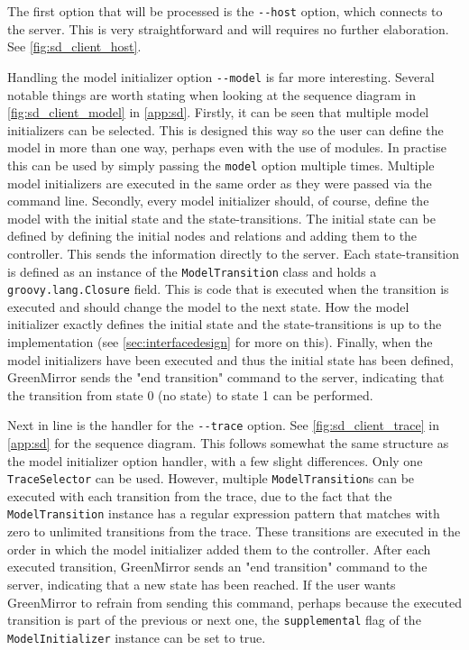\documentclass[a4paper]{article}
\begin{document}
	The first option that will be processed is the \lstinline{--host} option, which connects to the server. This is very straightforward and will requires no further elaboration. See \cref{fig:sd_client_host}.
	
	Handling the model initializer option \lstinline{--model} is far more interesting. Several notable things are worth stating when looking at the sequence diagram in \cref{fig:sd_client_model} in \cref{app:sd}. Firstly, it can be seen that multiple model initializers can be selected. This is designed this way so the user can define the model in more than one way, perhaps even with the use of modules. In practise this can be used by simply passing the \lstinline{model} option multiple times. Multiple model initializers are executed in the same order as they were passed via the command line. Secondly, every model initializer should, of course, define the model with the initial state and the state-transitions. The initial state can be defined by defining the initial nodes and relations and adding them to the controller. This sends the information directly to the server. Each state-transition is defined as an instance of the \lstinline{ModelTransition} class and holds a \lstinline{groovy.lang.Closure} field. This is code that is executed when the transition is executed and should change the model to the next state. How the model initializer exactly defines the initial state and the state-transitions is up to the implementation (see \cref{sec:interfacedesign} for more on this). Finally, when the model initializers have been executed and thus the initial state has been defined, GreenMirror sends the "end transition" command to the server, indicating that the transition from state 0 (no state) to state 1 can be performed. 
	
	Next in line is the handler for the \lstinline{--trace} option. See \cref{fig:sd_client_trace} in \cref{app:sd} for the sequence diagram. This follows somewhat the same structure as the model initializer option handler, with a few slight differences. Only one \lstinline{TraceSelector} can be used. However, multiple \lstinline{ModelTransition}s can be executed with each transition from the trace, due to the fact that the \lstinline{ModelTransition} instance has a regular expression pattern that matches with zero to unlimited transitions from the trace. These transitions are executed in the order in which the model initializer added them to the controller. After each executed transition, GreenMirror sends an "end transition" command to the server, indicating that a new state has been reached. If the user wants GreenMirror to refrain from sending this command, perhaps because the executed transition is part of the previous or next one, the \lstinline{supplemental} flag of the \lstinline{ModelInitializer} instance can be set to true.
	
\end{document}
